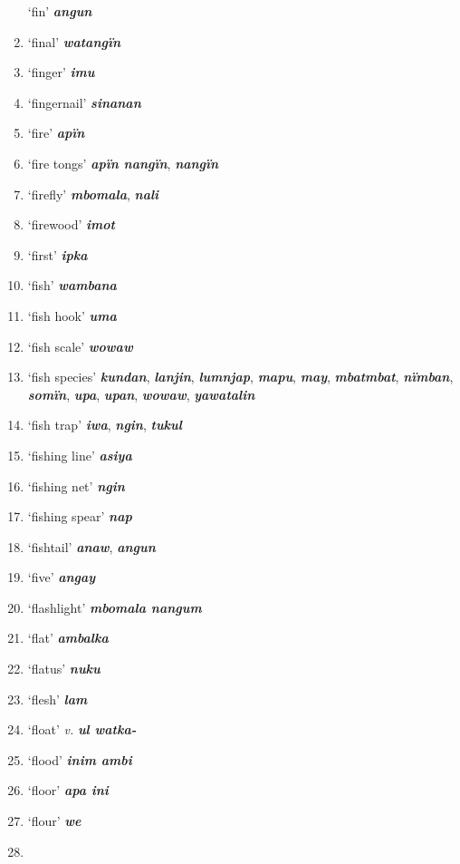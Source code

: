 \begin{enumerate}[noitemsep, label={}, align=left, widest=190, labelsep=1ex,leftmargin=*,itemindent=-10pt]
‘fin’ \textbf{\textit{angun}} \item
‘final’ \textbf{\textit{watangïn}} \item
‘finger’ \textbf{\textit{imu}} \item
‘fingernail’ \textbf{\textit{sinanan}} \item
‘fire’ \textbf{\textit{apïn}} \item
‘fire tongs’ \textbf{\textit{apïn nangïn}}, \textbf{\textit{nangïn}} \item
‘firefly’ \textbf{\textit{mbomala}}, \textbf{\textit{nali}} \item
‘firewood’ \textbf{\textit{imot}} \item
‘first’ \textbf{\textit{ipka}} \item
‘fish’ \textbf{\textit{wambana}} \item
‘fish hook’ \textbf{\textit{uma}} \item
‘fish scale’ \textbf{\textit{wowaw}} \item
‘fish species’ \textbf{\textit{kundan}}, \textbf{\textit{lanjin}}, \textbf{\textit{lumnjap}}, \textbf{\textit{mapu}}, \textbf{\textit{may}}, \textbf{\textit{mbatmbat}}, \textbf{\textit{nïmban}}, \linebreak \textbf{\textit{somïn}}, \textbf{\textit{upa}}, \textbf{\textit{upan}}, \textbf{\textit{wowaw}}, \textbf{\textit{yawatalin}} \item
‘fish trap’ \textbf{\textit{iwa}}, \textbf{\textit{ngin}}, \textbf{\textit{tukul}} \item
‘fishing line’ \textbf{\textit{asiya}} \item
‘fishing net’ \textbf{\textit{ngin}} \item
‘fishing spear’ \textbf{\textit{nap}} \item
‘fishtail’ \textbf{\textit{anaw}}, \textbf{\textit{angun}} \item
‘five’ \textbf{\textit{angay}} \item
‘flashlight’ \textbf{\textit{mbomala nangum}} \item
‘flat’ \textbf{\textit{ambalka}} \item
‘flatus’ \textbf{\textit{nuku}} \item
‘flesh’ \textbf{\textit{lam}} \item
‘float’ \textit{v.} \textbf{\textit{ul watka-}} \item
‘flood’ \textbf{\textit{inim ambi}} \item
‘floor’ \textbf{\textit{apa ini}} \item
‘flour’ \textbf{\textit{we}} \item

\end{enumerate}
